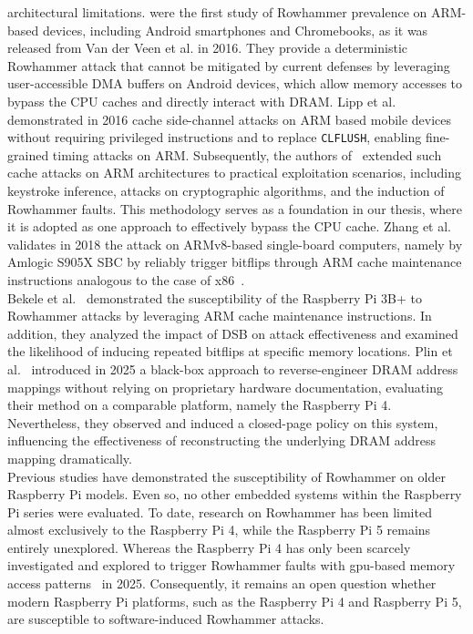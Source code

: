   architectural limitations. \cite{paperDrammer} were the first study of Rowhammer prevalence 
  on ARM-based devices, including Android smartphones and Chromebooks, as it 
  was released from Van der Veen et al. in 2016. They provide a deterministic 
  Rowhammer attack that cannot be mitigated by current defenses by leveraging 
  user-accessible DMA buffers on Android devices, which allow memory accesses 
  to bypass the CPU caches and directly interact with DRAM.
  Lipp et al.~\cite{paperARMageddon} demonstrated in 2016 cache side-channel attacks on ARM 
  based mobile devices without requiring privileged instructions and to 
  replace \texttt{CLFLUSH}, enabling fine-grained timing attacks on ARM.
  Subsequently, the authors of~\cite{thesisCacheAttacksandRH} extended such cache attacks on ARM 
  architectures to practical exploitation scenarios, including keystroke 
  inference, attacks on cryptographic algorithms, and the induction of 
  Rowhammer faults. This methodology serves as a foundation in our thesis, 
  where it is adopted as one approach to effectively bypass the CPU cache.
  Zhang et al.~\cite{paperTriggeringRHHardwareFault} validates in 2018 the attack on ARMv8-based single-board 
  computers, namely by Amlogic S905X SBC by reliably trigger bitflips through 
  ARM cache maintenance instructions analogous to the case of x86~\cite{paperRHonRi3B+}.
  \\
  Bekele et al.~\cite{paperRHonRi3B+} demonstrated the susceptibility of the Raspberry Pi 3B+ 
  to Rowhammer attacks by leveraging ARM cache maintenance instructions. In 
  addition, they analyzed the impact of DSB on attack effectiveness and examined 
  the likelihood of inducing repeated bitflips at specific memory locations.
  Plin et al.~\cite{paperKnockKnock} introduced in 2025 a black-box approach to reverse-engineer 
  DRAM address mappings without relying on proprietary hardware documentation, 
  evaluating their method on a comparable platform, namely the Raspberry Pi 4. 
  Nevertheless, they observed and induced a closed-page policy on this system, influencing 
  the effectiveness of reconstructing the underlying DRAM address mapping dramatically.
  \\
  Previous studies have demonstrated the susceptibility of Rowhammer on older 
  Raspberry Pi models. Even so, no other embedded systems within the Raspberry Pi 
  series were evaluated. To date, research on Rowhammer has been limited almost 
  exclusively to the Raspberry Pi 4, while the Raspberry Pi 5 remains entirely 
  unexplored. Whereas the Raspberry Pi 4 has only been scarcely investigated and 
  explored to trigger Rowhammer faults with \gls{gpu}-based memory access patterns~\cite{paperOpenGL} 
  in 2025.
  Consequently, it remains an open question whether modern Raspberry Pi platforms, 
  such as the Raspberry Pi 4 and Raspberry Pi 5, are susceptible to software-induced 
  Rowhammer attacks.
